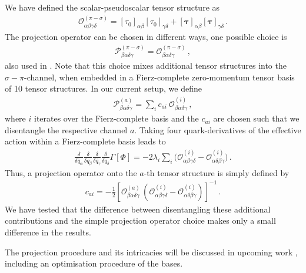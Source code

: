 \documentclass[aps,twocolumn,prd,superscriptaddress]{revtex4-2}
\begin{document}
%
We have defined the scalar-pseudoscalar tensor structure as
%
\begin{align}
	\mathcal{O}^{\scriptscriptstyle(\pi-\sigma)}_{\alpha\beta\gamma\delta} = [\tau_0]_{\alpha\beta}[\tau_0]_{\gamma\delta} + [\bm\tau]_{\alpha\beta}[\bm\tau]_{\gamma\delta}\,.
\end{align}
%
The projection operator can be chosen in different ways, one possible choice is
%
\begin{align}\label{eq:4fermiProjectorOld}
	\mathcal{P}^{\scriptscriptstyle(\pi-\sigma)}_{\beta\alpha\delta\gamma} = \mathcal{O}^{\scriptscriptstyle(\pi-\sigma)}_{\beta\alpha\delta\gamma}\,, 
\end{align}
%
also used in \cite{Fu:2019hdw}. Note that this choice mixes additional tensor structures into the $\sigma-\pi$-channel, when embedded in a Fierz-complete zero-momentum tensor basis of 10 tensor structures. In our current setup, we define
%
\begin{align}\label{eq:4fermiProjector}
	\mathcal{P}^{\scriptscriptstyle(a)}_{\beta\alpha\delta\gamma} = \sum_i c_{ai}\  \mathcal{O}^{\scriptscriptstyle(i)}_{\beta\alpha\delta\gamma}\,,
\end{align}
%
where $i$ iterates over the Fierz-complete basis and the $c_{ai}$ are chosen such that we disentangle the respective channel $a$. Taking four quark-derivatives of the effective action within a Fierz-complete basis leads to 
%
\begin{align}
	\frac{\delta}{\delta \bar q_\alpha}\frac{\delta}{\delta q_\beta}\frac{\delta}{\delta \bar q_\gamma}\frac{\delta}{\delta q_\delta} \Gamma[\Phi] = -2 \lambda_i \sum_i \Big( \mathcal{O}^{\scriptscriptstyle(i)}_{\alpha\beta\gamma\delta} - \mathcal{O}^{\scriptscriptstyle(i)}_{\alpha\delta\beta\gamma}
	\Big)\,.
\end{align}
%
Thus, a projection operator onto the $a$-th tensor structure is simply defined by
%
\begin{align}\label{eq:4fermiProjectorexpl}
	c_{ai} = -\frac12 \left[
	\mathcal{O}^{\scriptscriptstyle(a)}_{\beta\alpha\delta\gamma}\,(
	\mathcal{O}^{\scriptscriptstyle(i)}_{\alpha\beta\gamma\delta} - \mathcal{O}^{\scriptscriptstyle(i)}_{\alpha\delta\beta\gamma})
	\right]^{-1}\,.
\end{align}
%
We have tested that the difference between disentangling these additional contributions and the simple projection operator choice  makes only a small difference in the results.

The projection procedure and its intricacies will be discussed in upcoming work \cite{?SW2024}, including an optimisation procedure of the bases.
\end{document}
